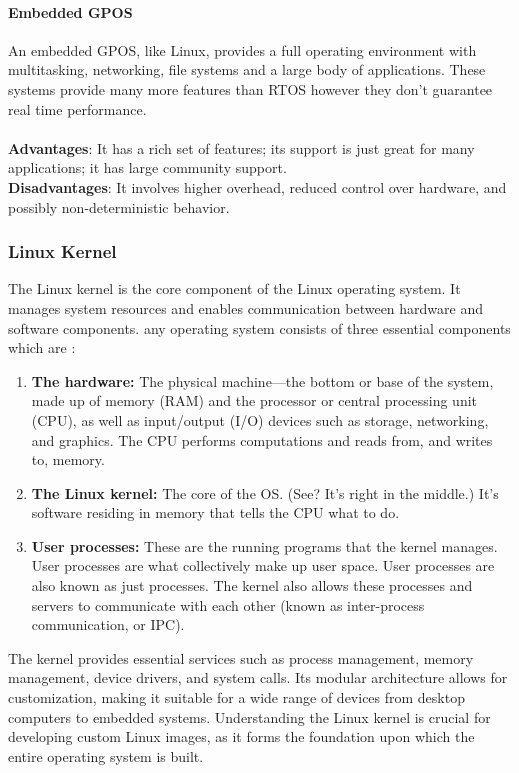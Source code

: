 \paragraph{\textbf{Embedded GPOS}}
An embedded GPOS, like Linux, provides a full operating environment with multitasking, networking, file systems and a large body of applications. These systems provide many more features than RTOS however they don't guarantee real time performance.\\ \\
\noindent 
\textbf{Advantages}: It has a rich set of features; its support is just great for many applications; it has large community support.\\
\textbf{Disadvantages}: It involves higher overhead, reduced control over hardware, and possibly non-deterministic behavior.\\

\subsubsection{Linux Kernel} 

The Linux kernel is the core component of the Linux operating system. It manages system resources and enables communication between hardware and software components. 
any operating system consists of three essential components which are :
\begin{enumerate}
    \item \textbf{The hardware:} The physical machine—the bottom or base of the system, made up of memory (RAM) and the processor or central processing unit (CPU), as well as input/output (I/O) devices such as storage, networking, and graphics. The CPU performs computations and reads from, and writes to, memory.
    \item 	\textbf{The Linux kernel: }The core of the OS. (See? It’s right in the middle.) It’s software residing in memory that tells the CPU what to do.
    \item \textbf{User processes:} These are the running programs that the kernel manages. User processes are what collectively make up user space. User processes are also known as just processes. The kernel also allows these processes and servers to communicate with each other (known as inter-process communication, or IPC). 	\\
\end{enumerate}

The kernel provides essential services such as process management, memory management, device drivers, and system calls. Its modular architecture allows for customization, making it suitable for a wide range of devices from desktop computers to embedded systems. Understanding the Linux kernel is crucial for developing custom Linux images, as it forms the foundation upon which the entire operating system is built.

